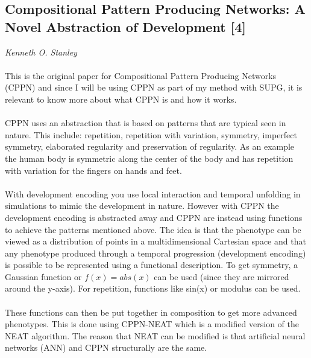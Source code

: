 \documentclass[11pt, a4paper]{article}
\begin{document}
\subsection{Compositional Pattern Producing Networks: A Novel Abstraction of Development [4]}
\textit{Kenneth O. Stanley}
\\ \\
This is the original paper for Compositional Pattern Producing Networks (CPPN) and since I will be using CPPN as part of my method with SUPG, it is relevant to know more about what CPPN is and how it works.
\\ \\
CPPN uses an abstraction that is based on patterns that are typical seen in nature. This include: repetition, repetition with variation, symmetry, imperfect symmetry, elaborated regularity and preservation of regularity. As an example the human body is symmetric along the center of the body and has repetition with variation for the fingers on hands and feet.
\\ \\
With development encoding you use local interaction and temporal unfolding in simulations to mimic the development in nature. However with CPPN the development encoding is abstracted away and CPPN are instead using functions to achieve the patterns mentioned above. The idea is that the phenotype can be viewed as a distribution of points in a multidimensional Cartesian space and that any phenotype produced through a temporal progression (development encoding) is possible to be represented using a functional description. To get symmetry, a Gaussian function or $ f(x) = abs(x) $ can be used (since they are mirrored around the y-axis). For repetition, functions like sin(x) or modulus can be used. 
\\ \\
These functions can then be put together in composition to get more advanced phenotypes. This is done using CPPN-NEAT which is a modified version of the NEAT algorithm. The reason that NEAT can be modified is that artificial neural networks (ANN) and CPPN structurally are the same.
\end{document}
